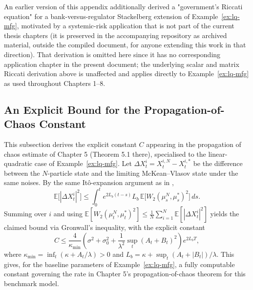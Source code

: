 \begin{remark}
An earlier version of this appendix additionally derived a "government's Riccati
equation" for a bank-versus-regulator Stackelberg extension of
Example~\ref{ex:lq-mfg}, motivated by a systemic-risk application that is not part
of the current thesis chapters (it is preserved in the accompanying repository as
archived material, outside the compiled document, for anyone extending this work
in that direction). That derivation is omitted here since it has no corresponding
application chapter in the present document; the underlying scalar and matrix
Riccati derivation above is unaffected and applies directly to
Example~\ref{ex:lq-mfg} as used throughout Chapters 1--8.
\end{remark}

\subsection{An Explicit Bound for the Propagation-of-Chaos Constant}

This subsection derives the explicit constant $C$ appearing in the propagation of
chaos estimate of Chapter 5 (Theorem 5.1 there), specialised to the
linear-quadratic case of Example~\ref{ex:lq-mfg}. Let
$\Delta X_t^i = X_t^{i,N} - X_t^{i,*}$ be the difference between the $N$-particle
state and the limiting McKean--Vlasov state under the same noises. By the
same It\^o-expansion argument as in ,
\[
    \mathbb{E}\big[|\Delta X_t^i|^2\big] \leq \int_0^t e^{2L_b(t-s)} L_b\,
    \mathbb{E}\big[W_2(\mu_s^N, \mu_s^*)^2\big]\, ds.
\]
Summing over $i$ and using $\mathbb{E}[W_2(\mu_t^N,\mu_t^*)^2] \leq
\frac{1}{N}\sum_{i=1}^N \mathbb{E}[|\Delta X_t^i|^2]$ yields the claimed bound via
Gronwall's inequality, with the explicit constant
\[
    C \leq \frac{4}{\kappa_{\min}}\left( \sigma^2 + \sigma_0^2 + \frac{1}{\lambda^2}
    \sup_t (A_t+B_t)^2 \right) e^{2L_b T},
\]
where $\kappa_{\min} = \inf_t(\kappa + A_t/\lambda) > 0$ and $L_b = \kappa +
\sup_t(A_t + |B_t|)/\lambda$. This gives, for the baseline parameters of
Example~\ref{ex:lq-mfg}, a fully computable constant governing the rate in
Chapter 5's propagation-of-chaos theorem for this benchmark model.
